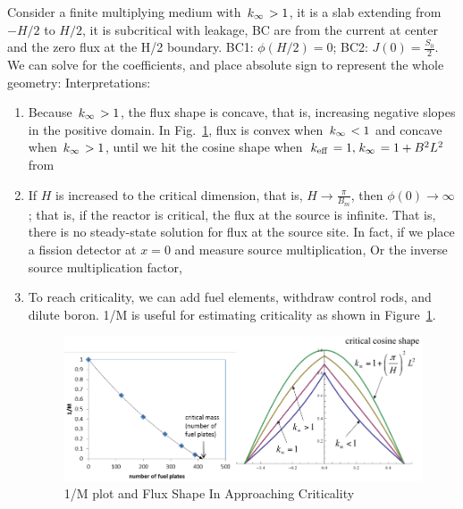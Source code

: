 \documentclass{school-22.211-notes}
\begin{document}
\clearpage
{}
Consider a finite multiplying medium with $\left. k_{\infty} \right. > 1$, it is a slab extending from $-H/2$ to $H/2$, it is subcritical with leakage, BC are from the current at center and the zero flux at the H/2 boundary. 
BC1: $\phi(H/2) = 0$; BC2: $J(0) = \frac{S_0}{2}$. We can solve for the coefficients, and place absolute sign to represent the whole geometry: 
Interpretations:
\begin{enumerate}
\item Because $\left. k_{\infty} \right. > 1$, the flux shape is concave, that is, increasing negative slopes in the positive domain. In Fig.~\ref{approach-critical}, flux is convex when $\left. k_{\infty} \right. < 1$ and concave when $\left. k_{\infty} \right. > 1$, until we hit the cosine shape when $\left. k_{\mathrm{eff}} \right. = 1, \left. k_{\infty} \right. = 1 + B^2L^2$ from 
\item If $H$ is increased to the critical dimension, that is, $H \to \frac{\pi}{B_m}$, then $\phi(0) \to \infty$; that is, if the reactor is critical, the flux at the source is infinite. That is, there is no steady-state solution for flux at the source site. In fact, if we place a fission detector at $x=0$ and measure source multiplication, 
  Or the inverse source multiplication factor, 
\item To reach criticality, we can add fuel elements, withdraw control rods, and dilute boron. 1/M is useful for estimating criticality as shown in Figure~\ref{approach-critical}. 
  \begin{figure}[ht]
    \centering
    \includegraphics[width=5in]{images/dfs/approach-critical.png}
    \caption{1/M plot and Flux Shape In Approaching Criticality}\label{approach-critical}
  \end{figure}
\end{enumerate}
\end{document}
